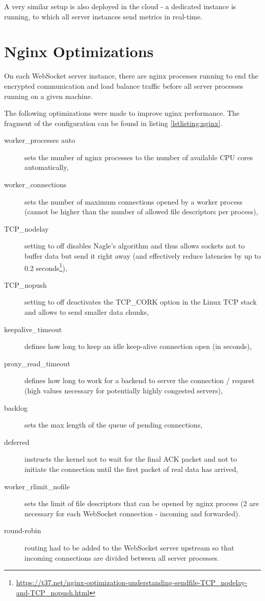 \documentclass{uvamscse}
\begin{document}
A very similar setup is also deployed in the cloud - a dedicated instance is running, to which all server instances send metrics in real-time.

\section{Nginx Optimizations}
On each WebSocket server instance, there are nginx processes running to end the encrypted communication and load balance traffic before all server processes running on a given machine.

The following optimizations were made to improve nginx performance. The fragment of the configuration can be found in listing \ref{lstlisting:nginx}.

\begin{description}
  \item [worker\_processes auto] sets the number of nginx processes to the number of available CPU cores automatically,
  \item [worker\_connections] sets the number of maximum connections opened by a worker process (cannot be higher than the number of allowed file descriptors per process),
  \item [TCP\_nodelay] setting to off disables Nagle’s algorithm and thus allows sockets not to buffer data but send it right away (and effectively reduce latencies by up to 0.2 seconds\footnote{\url{https://t37.net/nginx-optimization-understanding-sendfile-TCP\_nodelay-and-TCP_nopush.html}}),
  \item [TCP\_nopush] setting to off deactivates the TCP\_CORK option in the Linux TCP stack and allows to send smaller data chunks,
  \item [keepalive\_timeout] defines how long to keep an idle keep-alive connection open (in seconds),
  \item [proxy\_read\_timeout] defines how long to work for a backend to server the connection / request (high values necessary for potentially highly congested servers),
  \item [backlog] sets the max length of the queue of pending connections,
  \item [deferred] instructs the kernel not to wait for the final ACK packet and not to initiate the connection until the first packet of real data has arrived,
  \item [worker\_rlimit\_nofile] sets the limit of file descriptors that can be opened by nginx process (2 are necessary for each WebSocket connection - incoming and forwarded).
  \item [round-robin] routing had to be added to the WebSocket server upstream so that incoming connections are divided between all server processes.
\end{description}
\end{document}
